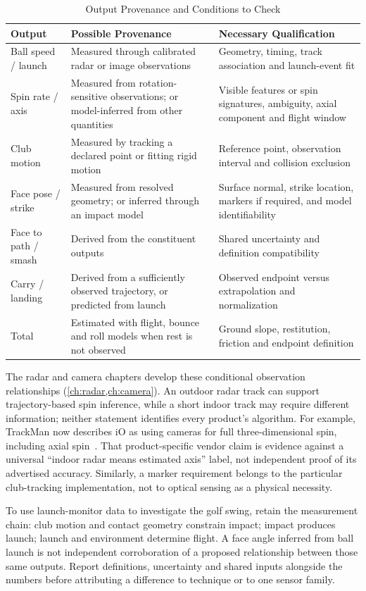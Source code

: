 \begin{table}[htbp]
\centering\small
\caption{Output Provenance and Conditions to Check}
\label{tab:hierarchy}
\begin{tabular}{@{}p{3cm}p{6cm}p{5.5cm}@{}}
\toprule
\textbf{Output} & \textbf{Possible Provenance} & \textbf{Necessary Qualification} \\
\midrule
Ball speed / launch & Measured through calibrated radar or image observations & Geometry, timing, track association and launch-event fit \\
Spin rate / axis & Measured from rotation-sensitive observations; or model-inferred from other quantities & Visible features or spin signatures, ambiguity, axial component and flight window \\
Club motion & Measured by tracking a declared point or fitting rigid motion & Reference point, observation interval and collision exclusion \\
Face pose / strike & Measured from resolved geometry; or inferred through an impact model & Surface normal, strike location, markers if required, and model identifiability \\
Face to path / smash & Derived from the constituent outputs & Shared uncertainty and definition compatibility \\
Carry / landing & Derived from a sufficiently observed trajectory, or predicted from launch & Observed endpoint versus extrapolation and normalization \\
Total & Estimated with flight, bounce and roll models when rest is not observed & Ground slope, restitution, friction and endpoint definition \\
\bottomrule
\end{tabular}
\end{table}

The radar and camera chapters develop these conditional observation relationships (\cref{ch:radar,ch:camera}).
An outdoor radar track can support trajectory-based spin inference, while a short indoor track may require different information; neither statement identifies every product's algorithm.
For example, TrackMan now describes iO as using cameras for full three-dimensional spin, including axial spin~\cite{trackmaniospin}.
That product-specific vendor claim is evidence against a universal ``indoor radar means estimated axis'' label, not independent proof of its advertised accuracy.
Similarly, a marker requirement belongs to the particular club-tracking implementation, not to optical sensing as a physical necessity.

\begin{implication}
To use launch-monitor data to investigate the golf swing, retain the measurement chain: club motion and contact geometry constrain impact; impact produces launch; launch and environment determine flight.
A face angle inferred from ball launch is not independent corroboration of a proposed relationship between those same outputs.
Report definitions, uncertainty and shared inputs alongside the numbers before attributing a difference to technique or to one sensor family.
\end{implication}
